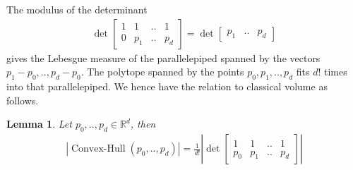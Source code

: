 \documentclass{scrartcl}
\theoremstyle{plain}
\newtheorem{lemma}[theorem]{Lemma}
\theoremstyle{definition}
\newcommand{\R}{\mathbb{R}}
\newcommand{\1}[1]{1_{\{#1\}}}
\newcommand{\ds}{d} %
\begin{document}
The modulus of the determinant 
\begin{align*}
   \det\left[
     \begin{matrix}
       1 & 1 & .. & 1 \\
       0 & p_1 & .. & p_{\ds}
     \end{matrix}
   \right]
   =
   \det\left[
     \begin{matrix}
       p_1 & .. & p_{\ds}
     \end{matrix}
   \right]
\end{align*}
gives the Lebesgue measure of the parallelepiped spanned by the vectors $p_1-p_0,..,p_\ds-p_0$.
The polytope spanned by the points $p_0,p_1,..,p_\ds$ fits $\ds!$ times into that parallelepiped.
%
We hence have the relation to classical volume as follows.
\begin{lemma}
  \label{lem:relationToClassicalVolume}
  Let $p_0,..,p_{\ds} \in \R^\ds$,
  then
  \begin{align*}
    | \operatorname{Convex-Hull}(p_0,..,p_\ds) |
    =
    \frac{1}{\ds!}
   \left|\det\left[
     \begin{matrix}
       1 & 1 & .. & 1 \\
       p_0 & p_1 & .. & p_{\ds}
     \end{matrix}
   \right]\right|
  \end{align*}
\end{lemma}
\end{document}
